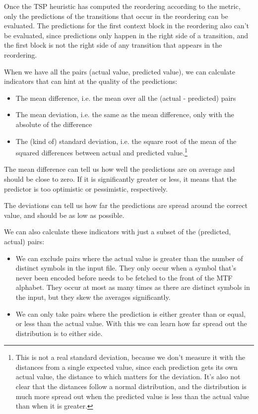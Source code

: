 \documentclass[a4paper]{scrreprt}
\begin{document}
Once the TSP heuristic has computed the reordering according to the metric,
only the predictions of the transitions that occur in the reordering can be
evaluated. The predictions for the first context block in the reordering also
can't be evaluated, since predictions only happen in the right side of a
transition, and the first block is not the right side of any transition that
appears in the reordering.

When we have all the pairs (actual value, predicted value), we can calculate
indicators that can hint at the quality of the predictions:
\begin{itemize}
  \item The mean difference, i.e. the mean over all the (actual - predicted)
  pairs
  \item The mean deviation, i.e. the same as the mean difference, only with the
  absolute of the difference
  \item The (kind of) standard deviation, i.e. the square root of the mean of
  the squared differences between actual and predicted value.\footnote{This is
  not a real standard deviation, because we don't measure it with the distances
  from a single expected value, since each prediction gets its own actual
  value, the distance to which matters for the deviation. It's also not clear
  that the distances follow a normal distribution, and the distribution is much
  more spread out when the predicted value is less than the actual value than
  when it is greater.}
\end{itemize}

The mean difference can tell us how well the predictions are on average and
should be close to zero. If it is significantly greater or less, it means that
the predictor is too optimistic or pessimistic, respectively.

The deviations can tell us how far the predictions are spread around the correct
value, and should be as low as possible.

We can also calculate these indicators with just a subset of the
(predicted, actual) pairs:
\begin{itemize}
  \item We can exclude pairs where the actual value is
  greater than the number of distinct symbols in the input file. They only occur
  when a symbol that's never been encoded before needs to be fetched to the
  front of the MTF alphabet. They occur at most as many times as there are
  distinct symbols in the input, but they skew the averages significantly.
  \item We can only take pairs where the prediction is either greater than or
  equal, or less than the actual value. With this we can learn how far spread
  out the distribution is to either side.
\end{itemize}
\end{document}
